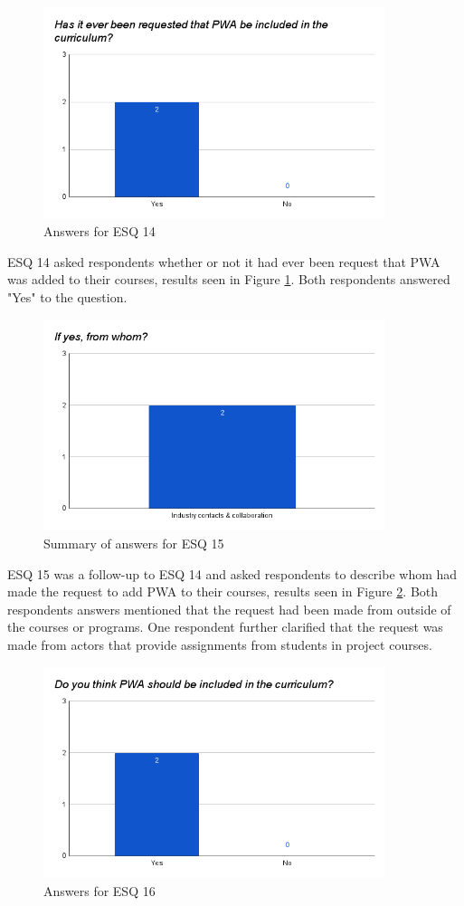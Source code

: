 \documentclass[a4paper,12pt]{article}
\begin{document}
\begin{figure}[ht!]
    \centering
    \includegraphics[width=10cm]{img/Results/esq14.png}
    \caption{Answers for ESQ 14}
    \label{fig:res_eduq14}
\end{figure}

ESQ 14 asked respondents whether or not it had ever been request that PWA was added to their courses, results seen in Figure \ref{fig:res_eduq14}. Both respondents answered "Yes" to the question.

\begin{figure}[ht!]
    \centering
    \includegraphics[width=10cm]{img/Results/esq15.png}
    \caption{Summary of answers for ESQ 15}
    \label{fig:res_eduq15}
\end{figure}

\newpage ESQ 15 was a follow-up to ESQ 14 and asked respondents to describe whom had made the request to add PWA to their courses, results seen in Figure \ref{fig:res_eduq15}. Both respondents answers mentioned that the request had been made from outside of the courses or programs. One respondent further clarified that the request was made from actors that provide assignments from students in project courses.

\begin{figure}[ht!]
    \centering
    \includegraphics[width=10cm]{img/Results/esq16.png}
    \caption{Answers for ESQ 16}
    \label{fig:res_eduq16}
\end{figure}
\end{document}
